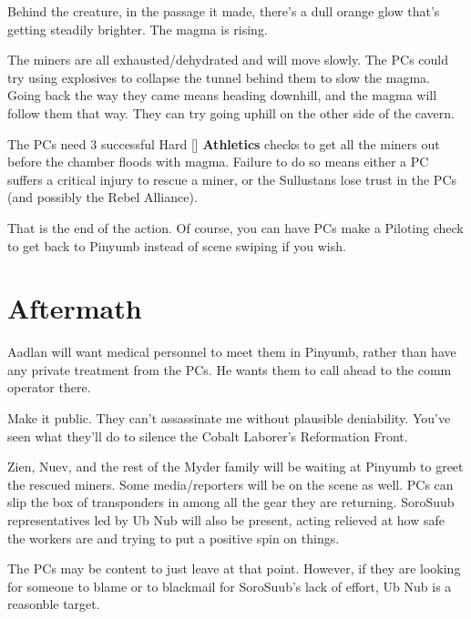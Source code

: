 \documentclass{book}
\newcommand{\df}{\difficulty}
\begin{document}
\begin{multicols}{2}
Behind the creature, in the passage it made, there’s a dull orange glow that’s getting steadily brighter. The magma is rising.

The miners are all exhausted/dehydrated and will move slowly. The PCs could try using explosives to collapse the tunnel behind them to slow the magma. Going back the way they came means heading downhill, and the magma will follow them that way. They can try going uphill on the other side of the cavern.

The PCs need 3 successful Hard [\df\df\df] \textbf{Athletics} checks to get all the miners out before the chamber floods with magma.  Failure to do so means either a PC suffers a critical injury to rescue a miner, or the Sullustans lose trust in the PCs (and possibly the Rebel Alliance).

That is the end of the action. Of course, you can have PCs make a Piloting check to get back to Pinyumb instead of scene swiping if you wish.

\section{Aftermath}

Aadlan will want medical personnel to meet them in Pinyumb, rather than have any private treatment from the PCs. He wants them to call ahead to the comm operator there.\\
\begin{quoting}
Make it public. They can’t assassinate me without plausible deniability.  You’ve seen what they’ll do to silence the Cobalt Laborer’s Reformation Front.
\end{quoting}

Zien, Nuev, and the rest of the Myder family will be waiting at Pinyumb to greet the rescued miners. Some media/reporters will be on the scene as well. PCs can slip the box of transponders in among all the gear they are returning. SoroSuub representatives led by Ub Nub will also be present, acting relieved at how safe the workers are and trying to put a positive spin on things.

The PCs may be content to just leave at that point. However, if they are looking for someone to blame or to blackmail for SoroSuub's lack of effort, Ub Nub is a reasonble target.


\end{multicols}
\end{document}
